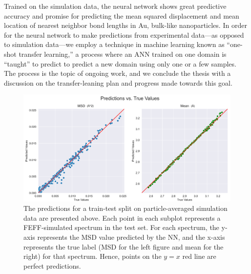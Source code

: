 Trained on the simulation data, the neural network shows great predictive accuracy and promise for predicting the mean squared displacement and mean location of nearest neighbor bond lengths in Au, bulk-like nanoparticles. In order for the neural network to make predictions from experimental data---as opposed to simulation data---we employ a technique in machine learning known as ``one-shot transfer learning,'' a process where an ANN trained on one domain is ``taught'' to predict to predict a new domain using only one or a few samples.  The process is the topic of ongoing work, and we conclude the thesis with a discussion on the transfer-leaning plan and progress made towards this goal.


\begin{figure}
    \centering
    \includegraphics[width=\linewidth]{Chapters/Figures/nn_rdf_validation_preds-fixed-just-msd-and-mean.png}
    \caption[Simulation Test Set Predictions]{The predictions for a train-test split on particle-averaged simulation data are presented above. Each point in each subplot represents a FEFF-simulated spectrum in the test set. For each spectrum, the y-axis represents the MSD value predicted by the NN, and the x-axis represents the true label (MSD for the left figure and mean for the right) for that spectrum. Hence, points on the $ y=x $ red line are perfect predictions.}
    \label{fig:train-test-split-just-msd-and-mean}
\end{figure}
